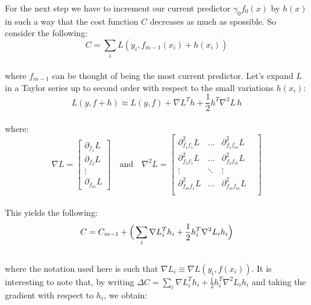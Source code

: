 For the next step we have to increment our current predictor $\gamma_0f_0(x)$ by $h(x)$ in such a way that the cost function $C$ decreases as much as spossible. So consider the following:\\

\begin{equation}
C = \sum_{i}L(y_i, f_{m-1}(x_i)+h(x_i))
\end{equation}\\

\noindent where $f_{m-1}$ can be thought of being the most current predictor. Let's expand $L$ in a Taylor series up to second order with respect to the small variations $h(x_i)$:\\

\begin{equation}
L(y, f+h)\approx L(y,f)+\nabla L^Th+\frac{1}{2}h^T\nabla^2L\,h
\end{equation}\\

\noindent where:\\

\begin{equation}
\nabla L=
\begin{bmatrix}
\partial_{f_1}L \\
\partial_{f_2}L \\
\vdots \\
\partial_{f_m}L
\end{bmatrix}\quad\text{and}\quad
\nabla^2 L=
\begin{bmatrix}
\partial^2_{f_1f_1}L&\dots&\partial^2_{f_1f_m}L& \\
\partial^2_{f_2f_1}L&\dots&\partial^2_{f_2f_m}L& \\
\vdots&\ddots&\vdots \\
\partial^2_{f_mf_1}L&\dots&\partial^2_{f_mf_m}L& \\
\end{bmatrix}
\end{equation}\\

This yields the following:\\

\begin{equation}
C = C_{m-1}+\Big(\sum_{i}\nabla L_i^Th_i+\frac{1}{2}h_i^T\nabla^2L_ih_i\Big)
\end{equation}\\

\noindent where the notation used here is such that $\nabla L_i\equiv\nabla L(y_i,f(x_i))$. It is interesting to note that, by writing $\Delta C = \sum_{i}\nabla L_i^Th_i+\frac{1}{2}h_i^T\nabla^2L_ih_i$ and taking the gradient with respect to $h_i$, we obtain:\\

